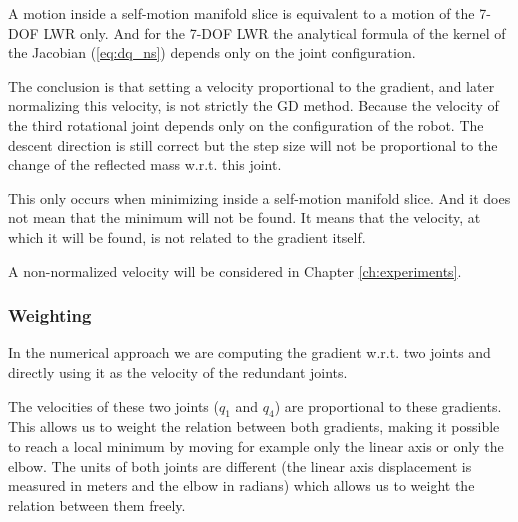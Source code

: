 A motion inside a self-motion manifold slice is equivalent to a motion of the 7-DOF LWR only. And for the 7-DOF LWR the analytical formula of the kernel of the Jacobian (\ref{eq:dq_ns}) depends only on the joint configuration.

The conclusion is that setting a velocity proportional to the gradient, and later normalizing this velocity, is not strictly the GD method. Because the velocity of the third rotational joint depends only on the configuration of the robot. The descent direction is still correct but the step size will not be proportional to the change of the reflected mass w.r.t. this joint. 

This only occurs when minimizing inside a self-motion manifold slice. And it does not mean that the minimum will not be found. It means that the velocity, at which it will be found, is not related to the gradient itself.

A non-normalized velocity will be considered in  Chapter  \ref{ch:experiments}.




\subsubsection{Weighting}
\label{subsubsec:weighting}

In the numerical approach we are computing the gradient w.r.t. two joints and directly using it as the velocity of the redundant joints.

The velocities of these two joints ($q_1$ and $q_4$) are proportional to these gradients. This allows us to weight the relation between both gradients, making it possible to reach a local minimum
by moving for example only the linear axis or only the elbow. The units of both joints are different (the linear axis displacement is measured in meters and the elbow in radians) which allows us to weight the relation between them freely.


